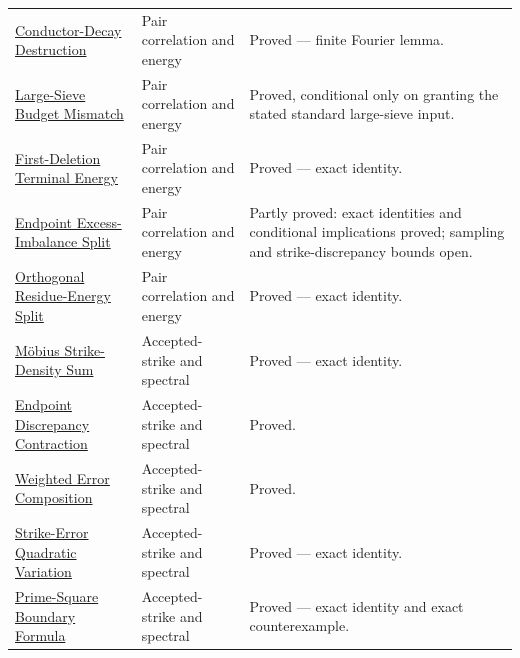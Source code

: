 {\begin{longtable}{>{\raggedright\arraybackslash}p{}>{\raggedright\arraybackslash}p{}>{\raggedright\arraybackslash}p{}}
\href{https://github.com/thiagomata/prime-numbers/blob/master/properties/sieve-sequence/short-interval-localization-destroys-prime-conductor-decay.md}{Conductor-Decay Destruction} & Pair correlation and energy & Proved --- finite Fourier lemma.\\
\href{https://github.com/thiagomata/prime-numbers/blob/master/properties/sieve-sequence/black-box-large-sieve-does-not-fit-weighted-collision-budget.md}{Large-Sieve Budget Mismatch} & Pair correlation and energy & Proved, conditional only on granting the stated standard large-sieve input.\\
\href{https://github.com/thiagomata/prime-numbers/blob/master/properties/sieve-sequence/first-deletion-pair-terminal-energy.md}{First-Deletion Terminal Energy} & Pair correlation and energy & Proved --- exact identity.\\
\href{https://github.com/thiagomata/prime-numbers/blob/master/properties/sieve-sequence/two-endpoint-observables-separate-harmful-excess-and-imbalance.md}{Endpoint Excess-Imbalance Split} & Pair correlation and energy & Partly proved: exact identities and conditional implications proved; sampling and strike-discrepancy bounds open.\\
\href{https://github.com/thiagomata/prime-numbers/blob/master/properties/sieve-sequence/orthogonal-residue-energy-decomposition-after-two-class-filter.md}{Orthogonal Residue-Energy Split} & Pair correlation and energy & Proved --- exact identity.\\
\href{https://github.com/thiagomata/prime-numbers/blob/master/properties/sieve-sequence/accepted-strike-density-boundary-decomposition.md}{Möbius Strike-Density Sum} & Accepted-strike and spectral & Proved --- exact identity.\\
\href{https://github.com/thiagomata/prime-numbers/blob/master/properties/sieve-sequence/endpoint-density-contracts-strike-discrepancy.md}{Endpoint Discrepancy Contraction} & Accepted-strike and spectral & Proved.\\
\href{https://github.com/thiagomata/prime-numbers/blob/master/properties/sieve-sequence/weighted-scalar-error-composition.md}{Weighted Error Composition} & Accepted-strike and spectral & Proved.\\
\href{https://github.com/thiagomata/prime-numbers/blob/master/properties/sieve-sequence/accepted-strike-quadratic-variation.md}{Strike-Error Quadratic Variation} & Accepted-strike and spectral & Proved --- exact identity.\\
\href{https://github.com/thiagomata/prime-numbers/blob/master/properties/sieve-sequence/prime-square-window-boundary-residue-formula.md}{Prime-Square Boundary Formula} & Accepted-strike and spectral & Proved --- exact identity and exact counterexample.\\

\end{longtable}}

